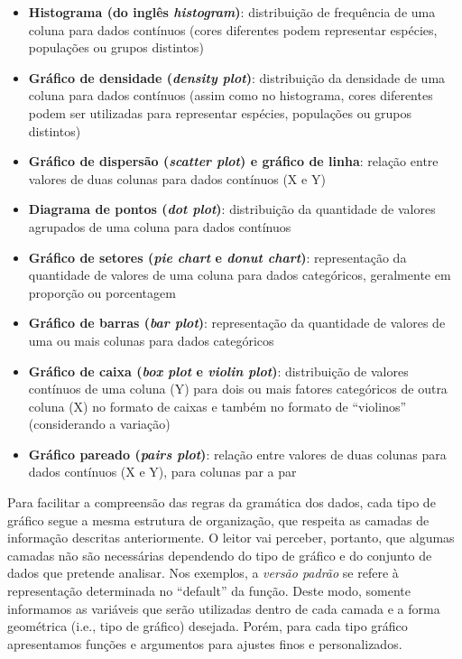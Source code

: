 \documentclass[
]{book}
\providecommand{\tightlist}{%
  \setlength{\itemsep}{0pt}\setlength{\parskip}{0pt}}
\begin{document}
\begin{itemize}
\tightlist
\item
  \textbf{Histograma (do inglês \emph{histogram})}: distribuição de frequência de uma coluna para dados contínuos (cores diferentes podem representar espécies, populações ou grupos distintos)
\item
  \textbf{Gráfico de densidade (\emph{density plot})}: distribuição da densidade de uma coluna para dados contínuos (assim como no histograma, cores diferentes podem ser utilizadas para representar espécies, populações ou grupos distintos)
\item
  \textbf{Gráfico de dispersão (\emph{scatter plot}) e gráfico de linha}: relação entre valores de duas colunas para dados contínuos (X e Y)
\item
  \textbf{Diagrama de pontos (\emph{dot plot})}: distribuição da quantidade de valores agrupados de uma coluna para dados contínuos
\item
  \textbf{Gráfico de setores (\emph{pie chart} e \emph{donut chart})}: representação da quantidade de valores de uma coluna para dados categóricos, geralmente em proporção ou porcentagem
\item
  \textbf{Gráfico de barras (\emph{bar plot})}: representação da quantidade de valores de uma ou mais colunas para dados categóricos
\item
  \textbf{Gráfico de caixa (\emph{box plot} e \emph{violin plot})}: distribuição de valores contínuos de uma coluna (Y) para dois ou mais fatores categóricos de outra coluna (X) no formato de caixas e também no formato de ``violinos'' (considerando a variação)
\item
  \textbf{Gráfico pareado (\emph{pairs plot})}: relação entre valores de duas colunas para dados contínuos (X e Y), para colunas par a par
\end{itemize}

Para facilitar a compreensão das regras da gramática dos dados, cada tipo de gráfico segue a mesma estrutura de organização, que respeita as camadas de informação descritas anteriormente. O leitor vai perceber, portanto, que algumas camadas não são necessárias dependendo do tipo de gráfico e do conjunto de dados que pretende analisar. Nos exemplos, a \emph{versão padrão} se refere à representação determinada no ``default'' da função. Deste modo, somente informamos as variáveis que serão utilizadas dentro de cada camada e a forma geométrica (i.e., tipo de gráfico) desejada. Porém, para cada tipo gráfico apresentamos funções e argumentos para ajustes finos e personalizados.
\end{document}
